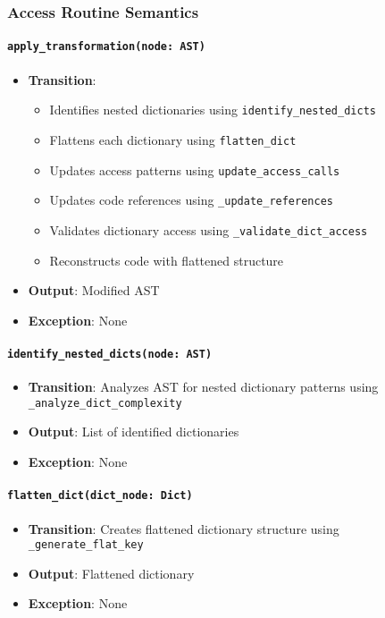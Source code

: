 \documentclass[12pt, titlepage]{article}
\begin{document}
\subsubsection{Access Routine Semantics}

\paragraph{\texttt{apply\_transformation(node: AST)}}
\begin{itemize}
  \item \textbf{Transition}:
    \begin{itemize}
      \item Identifies nested dictionaries using \texttt{identify\_nested\_dicts}
      \item Flattens each dictionary using \texttt{flatten\_dict}
      \item Updates access patterns using \texttt{update\_access\_calls}
      \item Updates code references using \texttt{\_update\_references}
      \item Validates dictionary access using \texttt{\_validate\_dict\_access}
      \item Reconstructs code with flattened structure
    \end{itemize}
  \item \textbf{Output}: Modified AST
  \item \textbf{Exception}: None
\end{itemize}

\paragraph{\texttt{identify\_nested\_dicts(node: AST)}}
\begin{itemize}
  \item \textbf{Transition}: Analyzes AST for nested dictionary patterns using \texttt{\_analyze\_dict\_complexity}
  \item \textbf{Output}: List of identified dictionaries
  \item \textbf{Exception}: None
\end{itemize}

\paragraph{\texttt{flatten\_dict(dict\_node: Dict)}}
\begin{itemize}
  \item \textbf{Transition}: Creates flattened dictionary structure using \texttt{\_generate\_flat\_key}
  \item \textbf{Output}: Flattened dictionary
  \item \textbf{Exception}: None
\end{itemize}
\end{document}
